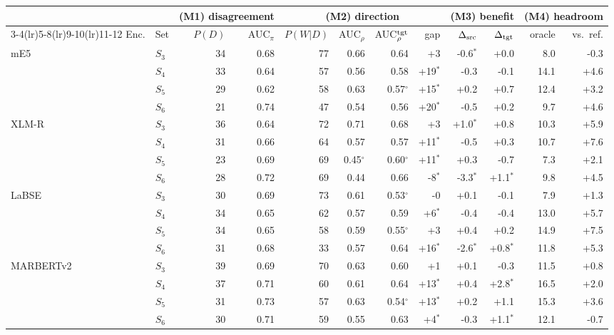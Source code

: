 \begin{tabular}{@{}llrrrrrrrrrr@{}}\toprule
 & & \multicolumn{2}{c}{(M1) disagreement} & \multicolumn{4}{c}{(M2) direction} & \multicolumn{2}{c}{(M3) benefit} & \multicolumn{2}{c}{(M4) headroom}\\
\cmidrule(lr){3-4}\cmidrule(lr){5-8}\cmidrule(lr){9-10}\cmidrule(lr){11-12}
Enc. & Set & $P(D)$ & AUC$_\pi$ & $P(W|D)$ & AUC$_\rho$ & AUC$_\rho^{\rm tgt}$ & gap & $\Delta_{\rm src}$ & $\Delta_{\rm tgt}$ & oracle & vs.\ ref.\\\midrule
mE5 & $S_3$ & 34 & 0.68 & 77 & 0.66 & 0.64 & +3 & -0.6$^{*}$ & +0.0 & 8.0 & -0.3\\
 & $S_4$ & 33 & 0.64 & 57 & 0.56 & 0.58 & +19$^{*}$ & -0.3 & -0.1 & 14.1 & +4.6\\
 & $S_5$ & 29 & 0.62 & 58 & 0.63 & 0.57$^\circ$ & +15$^{*}$ & +0.2 & +0.7 & 12.4 & +3.2\\
 & $S_6$ & 21 & 0.74 & 47 & 0.54 & 0.56 & +20$^{*}$ & -0.5 & +0.2 & 9.7 & +4.6\\
\midrule
XLM-R & $S_3$ & 36 & 0.64 & 72 & 0.71 & 0.68 & +3 & +1.0$^{*}$ & +0.8 & 10.3 & +5.9\\
 & $S_4$ & 31 & 0.66 & 64 & 0.57 & 0.57 & +11$^{*}$ & -0.5 & +0.3 & 10.7 & +7.6\\
 & $S_5$ & 23 & 0.69 & 69 & 0.45$^\circ$ & 0.60$^\circ$ & +11$^{*}$ & +0.3 & -0.7 & 7.3 & +2.1\\
 & $S_6$ & 28 & 0.72 & 69 & 0.44 & 0.66 & -8$^{*}$ & -3.3$^{*}$ & +1.1$^{*}$ & 9.8 & +4.5\\
\midrule
LaBSE & $S_3$ & 30 & 0.69 & 73 & 0.61 & 0.53$^\circ$ & -0 & +0.1 & -0.1 & 7.9 & +1.3\\
 & $S_4$ & 34 & 0.65 & 62 & 0.57 & 0.59 & +6$^{*}$ & -0.4 & -0.4 & 13.0 & +5.7\\
 & $S_5$ & 34 & 0.65 & 58 & 0.59 & 0.55$^\circ$ & +3 & +0.4 & +0.2 & 14.9 & +7.5\\
 & $S_6$ & 31 & 0.68 & 33 & 0.57 & 0.64 & +16$^{*}$ & -2.6$^{*}$ & +0.8$^{*}$ & 11.8 & +5.3\\
\midrule
MARBERTv2 & $S_3$ & 39 & 0.69 & 70 & 0.63 & 0.60 & +1 & +0.1 & -0.3 & 11.5 & +0.8\\
 & $S_4$ & 37 & 0.71 & 60 & 0.61 & 0.64 & +13$^{*}$ & +0.4 & +2.8$^{*}$ & 16.5 & +2.0\\
 & $S_5$ & 31 & 0.73 & 57 & 0.63 & 0.54$^\circ$ & +13$^{*}$ & +0.2 & +1.1 & 15.3 & +3.6\\
 & $S_6$ & 30 & 0.71 & 59 & 0.55 & 0.63 & +4$^{*}$ & -0.3 & +1.1$^{*}$ & 12.1 & -0.7\\
\bottomrule\end{tabular}
